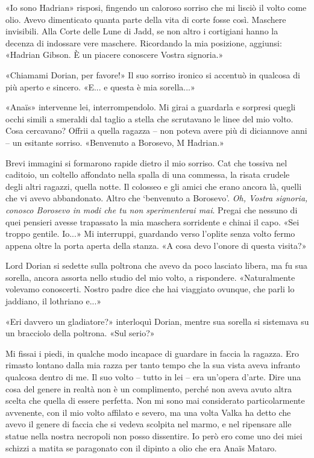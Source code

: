 «Io sono Hadrian» risposi, fingendo un caloroso sorriso che mi lisciò il
volto come olio. Avevo dimenticato quanta parte della vita di corte
fosse così. Maschere invisibili. Alla Corte delle Lune di Jadd, se non
altro i cortigiani hanno la decenza di indossare vere maschere.
Ricordando la mia posizione, aggiunsi: «Hadrian Gibson. È un piacere
conoscere Vostra signoria.»

«Chiamami Dorian, per favore!» Il suo sorriso ironico si accentuò in
qualcosa di più aperto e sincero. «E... e questa è mia sorella...»

«Anaïs» intervenne lei, interrompendolo. Mi girai a guardarla e sorpresi
quegli occhi simili a smeraldi dal taglio a stella che scrutavano le
linee del mio volto. Cosa cercavano? Offrii a quella ragazza -- non
poteva avere più di diciannove anni -- un esitante sorriso. «Benvenuto a
Borosevo, M Hadrian.»

Brevi immagini si formarono rapide dietro il mio sorriso. Cat che
tossiva nel caditoio, un coltello affondato nella spalla di una
commessa, la risata crudele degli altri ragazzi, quella notte. Il
colosseo e gli amici che erano ancora là, quelli che vi avevo
abbandonato. Altro che `benvenuto a Borosevo'. \emph{Oh, Vostra
	signoria, conosco Borosevo in modi che tu non sperimenterai mai}. Pregai
che nessuno di quei pensieri avesse trapassato la mia maschera
sorridente e chinai il capo. «Sei troppo gentile. Io...» Mi interruppi,
guardando verso l'oplite senza volto fermo appena oltre la porta aperta
della stanza. «A cosa devo l'onore di questa visita?»

Lord Dorian si sedette sulla poltrona che avevo da poco lasciato libera,
ma fu sua sorella, ancora assorta nello studio del mio volto, a
rispondere. «Naturalmente volevamo conoscerti. Nostro padre dice che hai
viaggiato ovunque, che parli lo jaddiano, il lothriano e...»

«Eri davvero un gladiatore?» interloquì Dorian, mentre sua sorella si
sistemava su un bracciolo della poltrona. «Sul serio?»

Mi fissai i piedi, in qualche modo incapace di guardare in faccia la
ragazza. Ero rimasto lontano dalla mia razza per tanto tempo che la sua
vista aveva infranto qualcosa dentro di me. Il suo volto -- tutto in lei
-- era un'opera d'arte. Dire una cosa del genere in realtà non è un
complimento, perché non aveva avuto altra scelta che quella di essere
perfetta. Non mi sono mai considerato particolarmente avvenente, con il
mio volto affilato e severo, ma una volta Valka ha detto che avevo il
genere di faccia che si vedeva scolpita nel marmo, e nel ripensare alle
statue nella nostra necropoli non posso dissentire. Io però ero come uno
dei miei schizzi a matita se paragonato con il dipinto a olio che era
Anaïs Mataro.

